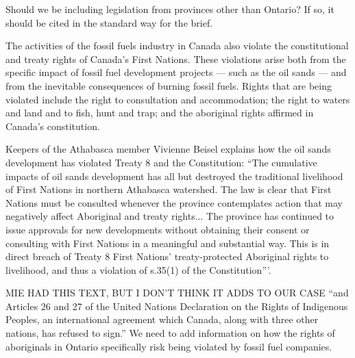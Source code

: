 \begin{vcom}
Should we be including legislation from provinces other than Ontario? If so, it should be cited in the standard way for the brief.
\end{vcom}

The activities of the fossil fuels industry in Canada also violate the constitutional and treaty rights of Canada's First Nations.
These violations arise both from the specific impact of fossil fuel development projects --- such as the oil sands --- and from the inevitable consequences of burning fossil fuels.
Rights that are being violated include the right to consultation and accommodation; the right to waters and land and to fish, hunt and trap; and the aboriginal rights affirmed in Canada's constitution.



Keepers of the Athabasca member Vivienne Beisel explains how the oil sands development has violated Treaty 8 and the Constitution: ``The cumulative impacts of oil sands development has all but destroyed the traditional livelihood of First Nations in northern Athabasca watershed. 
The law is clear that First Nations must be consulted whenever the province contemplates action that may negatively affect Aboriginal and treaty rights...
The province has continued to issue approvals for new developments without obtaining their consent or consulting with First Nations in a meaningful and substantial way. 
This is in direct breach of Treaty 8 First Nations' treaty-protected Aboriginal rights to livelihood, and thus a violation of s.35(1) of the Constitution'''.


\begin{vcom}
	MIE HAD THIS TEXT, BUT I DON'T THINK IT ADDS TO OUR CASE ``and Articles 26 and 27 of the United Nations Declaration on the Rights of Indigenous Peoples, an international agreement which Canada, along with three other nations, has refused to sign.'' We need to add information on how the rights of aboriginals in Ontario specifically risk being violated by fossil fuel companies.
\end{vcom}



